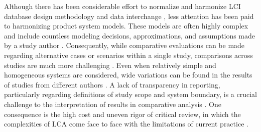 Although there has been considerable effort to normalize and harmonize %
LCI database design methodology and data interchange \citep{UNEP_2011, JRC_ILCD_ELCD_2013, Mila_e_Canals_2015, Ingwersen_JLCA_2015}, less attention has been paid to harmonizing product system models.  These models are often highly complex and include countless modeling decisions, approximations, and assumptions made by a study author \citep{Lloyd2007, reap2008_I}.  Consequently, while comparative evaluations can be made regarding alternative cases or scenarios within a single study, comparisons across studies are much more challenging \citep{Heath2012, Henriksson2014}.  Even when relatively simple and homogeneous systems are considered, wide variations can be found in the results of studies from different authors \citep{van_der_Harst_2013, Turconi_2013}.
A lack of transparency in reporting,
particularly regarding definitions of study scope and system boundary,
is a crucial challenge to the interpretation of results in comparative analysis \citep{Cleary2009, Laurent_2014}.
One consequence
is the high cost and uneven rigor of critical review, in which the complexities of LCA come face to face with the limitations of current practice \citep{Curran2014}.  

